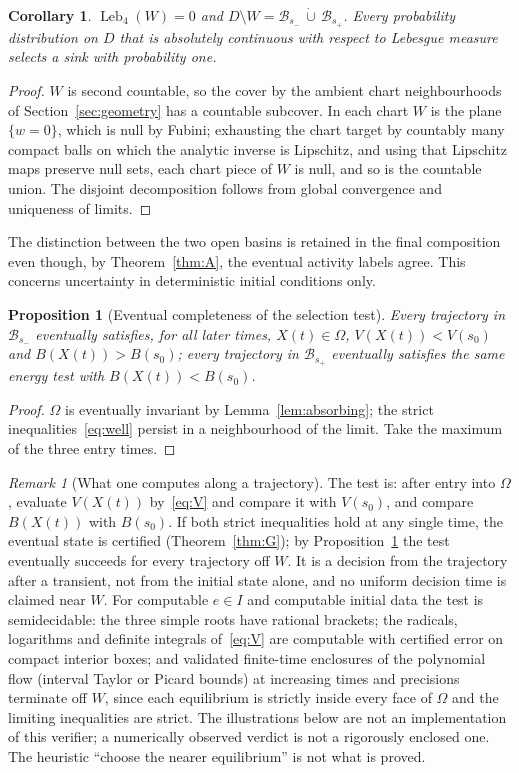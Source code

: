 \documentclass[11pt,a4paper]{article}
\theoremstyle{plain}
\newtheorem{proposition}[theorem]{Proposition}
\newtheorem{corollary}[theorem]{Corollary}
\theoremstyle{definition}
\theoremstyle{remark}
\newtheorem{remark}[theorem]{Remark}
\newcommand{\B}{\mathcal{B}}
\DeclareMathOperator{\Leb}{Leb}
\begin{document}
\begin{corollary}\label{cor:null}
$\Leb_4(W)=0$ and $D\setminus W=\B_{s_-}\,\dot\cup\,\B_{s_+}$. Every probability distribution on $D$ that is absolutely continuous with respect to Lebesgue measure selects a sink with probability one.
\end{corollary}
\begin{proof}
$W$ is second countable, so the cover by the ambient chart neighbourhoods of Section~\ref{sec:geometry} has a countable subcover. In each chart $W$ is the plane $\{w=0\}$, which is null by Fubini; exhausting the chart target by countably many compact balls on which the analytic inverse is Lipschitz, and using that Lipschitz maps preserve null sets, each chart piece of $W$ is null, and so is the countable union. The disjoint decomposition follows from global convergence and uniqueness of limits.
\end{proof}

The distinction between the two open basins is retained in the final composition even though, by Theorem~\ref{thm:A}, the eventual activity labels agree. This concerns uncertainty in deterministic initial conditions only.

\begin{proposition}[Eventual completeness of the selection test]\label{prop:decision}
Every trajectory in $\B_{s_-}$ eventually satisfies, for all later times, $X(t)\in\Omega$, $V(X(t))<V(s_0)$ and $B(X(t))>B(s_0)$; every trajectory in $\B_{s_+}$ eventually satisfies the same energy test with $B(X(t))<B(s_0)$.
\end{proposition}
\begin{proof}
$\Omega$ is eventually invariant by Lemma~\ref{lem:absorbing}; the strict inequalities~\eqref{eq:well} persist in a neighbourhood of the limit. Take the maximum of the three entry times.
\end{proof}

\begin{remark}[What one computes along a trajectory]\label{rem:test}
The test is: after entry into $\Omega$, evaluate $V(X(t))$ by~\eqref{eq:V} and compare it with $V(s_0)$, and compare $B(X(t))$ with $B(s_0)$. If both strict inequalities hold at any single time, the eventual state is certified (Theorem~\ref{thm:G}); by Proposition~\ref{prop:decision} the test eventually succeeds for every trajectory off $W$. It is a decision from the trajectory after a transient, not from the initial state alone, and no uniform decision time is claimed near $W$. For computable $e\in I$ and computable initial data the test is semidecidable: the three simple roots have rational brackets; the radicals, logarithms and definite integrals of~\eqref{eq:V} are computable with certified error on compact interior boxes; and validated finite-time enclosures of the polynomial flow (interval Taylor or Picard bounds) at increasing times and precisions terminate off $W$, since each equilibrium is strictly inside every face of $\Omega$ and the limiting inequalities are strict. The illustrations below are not an implementation of this verifier; a numerically observed verdict is not a rigorously enclosed one. The heuristic ``choose the nearer equilibrium'' is not what is proved.
\end{remark}
\end{document}

